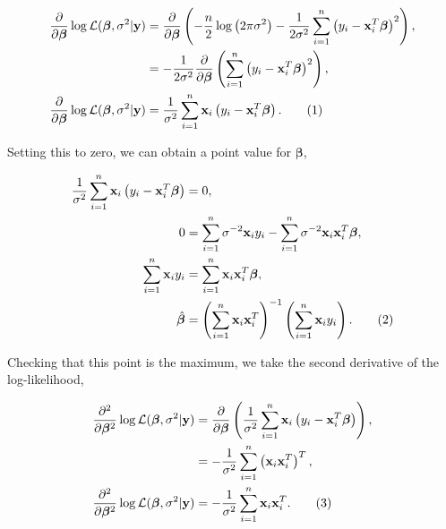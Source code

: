 \documentclass[honours,12pt]{unswthesis}
\newcommand{\s}{\sum_{i=1}^{n}}
\newcommand\numberthis{\addtocounter{equation}{1}\tag{\theequation}}
\numberwithin{equation}{section}
\begin{document}
\begin{align*}
	\frac{\partial}{\partial \bm{\beta}} \log\mathcal{L}(\bm{\beta},\sigma^{2} | \mathbf{y}) &= \frac{\partial}{\partial \bm{\beta}} \left( -\frac{n}{2}\log\left(2 \pi \sigma^{2}\right) - \frac{1}{2\sigma^{2}}\sum_{i=1}^{n}\left( y_{i} - \mathbf{x}_{i}^{T}\bm{\beta} \right)^{2}\right) ,\\
	&= - \frac{1}{2\sigma^{2}} \frac{\partial}{\partial \bm{\beta}} \left( \sum_{i=1}^{n}\left( y_{i} - \mathbf{x}_{i}^{T}\bm{\beta} \right)^{2} \right),\\
	\frac{\partial}{\partial \bm{\beta}} \log\mathcal{L}(\bm{\beta},\sigma^{2} | \mathbf{y}) &= \frac{1}{\sigma^{2}} \sum_{i=1}^{n} \mathbf{x}_{i} \left( y_{i} - \mathbf{x}_{i}^{T}\bm{\beta} \right). \numberthis \label{partialbeta1}
\end{align*}

\noindent Setting this to zero, we can obtain a point value for $\bm{\beta}$, 

\begin{align*}
	\frac{1}{\sigma^{2}} \sum_{i=1}^{n} \mathbf{x}_{i} \left( y_{i} - \mathbf{x}_{i}^{T}\bm{\beta} \right) &= 0, \\
	0 &= \sum_{i=1}^{n} \sigma^{-2} \mathbf{x}_{i} y_{i} - \sum_{i=1}^{n} \sigma^{-2} \mathbf{x}_{i} \mathbf{x}_{i}^{T}\bm{\beta},\\
	\s \mathbf{x}_{i}y_{i} &= \s \mathbf{x}_{i} \mathbf{x}_{i}^{T} \bm{\beta},\\
	\hat{\bm{\beta}} &= \left( \s \mathbf{x}_{i} \mathbf{x}_{i}^{T} \right)^{-1} \left( \s \mathbf{x}_{i}y_{i} \right). \numberthis \label{real_beta}
\end{align*}

\noindent Checking that this point is the maximum, we take the second derivative of the log-likelihood,

\begin{align*}
	\frac{\partial^{2}}{\partial \bm{\beta}^{2}} \log\mathcal{L}(\bm{\beta},\sigma^{2} | \mathbf{y}) &= \frac{\partial}{\partial \bm{\beta}} \left( \frac{1}{\sigma^{2}} \s \mathbf{x}_{i} \left( y_{i} - \mathbf{x}_{i}^{T}\bm{\beta} \right) \right) ,\\
	&= -\frac{1}{\sigma^{2}} \s \left( \mathbf{x}_{i} \mathbf{x}_{i}^{T} \right)^{T},\\
	\frac{\partial^{2}}{\partial \bm{\beta}^{2}} \log\mathcal{L}(\bm{\beta},\sigma^{2} | \mathbf{y}) &= -\frac{1}{\sigma^{2}} \s \mathbf{x}_{i} \mathbf{x}_{i}^{T}. \numberthis \label{partialbeta2}
\end{align*}
\end{document}
